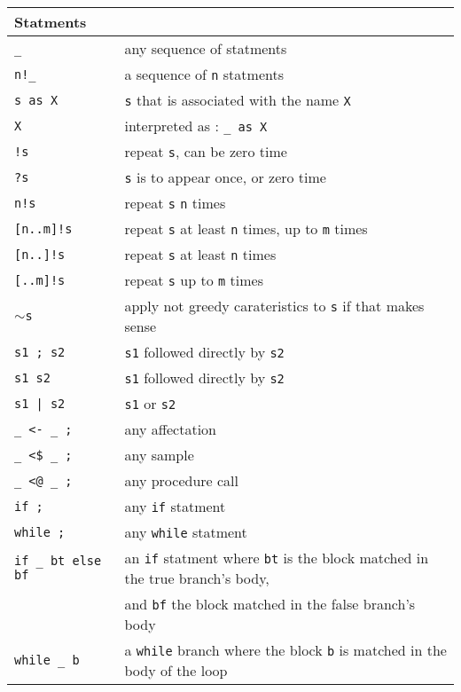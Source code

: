 \begin{tabular}{| l | l |}
  \hline
  Statments&\\
  \hline
  \texttt{\_} & any sequence of statments \\
  \texttt{n!\_} & a sequence of  \texttt{n} statments \\
  \texttt{s as X} &  \texttt{s} that is associated with the name  \texttt{X}\\
  \texttt{X} & interpreted as : \texttt{\_ as X} \\
  \hline
  \texttt{!s} & repeat  \texttt{s}, can be zero time \\
  \texttt{?s} &  \texttt{s} is to appear once, or zero time \\
  \texttt{n!s} & repeat  \texttt{s}  \texttt{n} times \\
  \texttt{[n..m]!s} & repeat  \texttt{s} at least  \texttt{n} times, up to  \texttt{m} times \\
  \texttt{[n..]!s} & repeat  \texttt{s} at least  \texttt{n} times \\
  \texttt{[..m]!s} & repeat  \texttt{s} up to  \texttt{m} times \\
  \texttt{$\sim$s} & apply not greedy carateristics to  \texttt{s} if that makes sense\\
  \hline
  \texttt{s1 ; s2} &  \texttt{s1} followed directly by  \texttt{s2} \\
  \texttt{s1 s2} &  \texttt{s1} followed directly by  \texttt{s2} \\
  \texttt{s1 | s2} &  \texttt{s1} or  \texttt{s2} \\
  \hline
  \texttt{\_ <- \_ ;} & any affectation \\
  \texttt{\_ <\$ \_ ;} & any sample \\
  \texttt{\_ <@ \_ ;} & any procedure call \\
  \texttt{if ;} & any  \texttt{if} statment \\
  \texttt{while ;} & any  \texttt{while} statment \\
  \texttt{if \_ bt else bf} & an \texttt{if} statment where  \texttt{bt} is the
  block matched in the true branch's body,\\
  & and \texttt{bf} the block matched in the false branch's body\\
  \texttt{while \_ b} & a \texttt{while} branch where the block  \texttt{b}
  is matched in the body of the loop\\
  \hline
\end{tabular}




